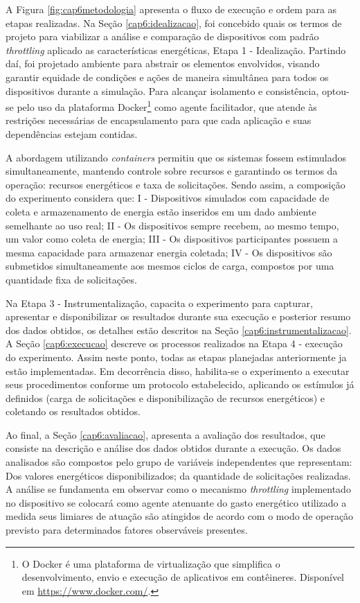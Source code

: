A Figura \ref{fig:cap6metodologia} apresenta o fluxo de execução e ordem para as etapas realizadas. Na Seção \ref{cap6:idealizacao}, foi concebido quais os termos de projeto para viabilizar a análise e comparação de dispositivos com padrão \textit{throttling} aplicado as características energéticas, Etapa 1 - Idealização. Partindo daí, foi projetado ambiente para abstrair os elementos envolvidos, visando garantir equidade de condições e ações de maneira simultânea para todos os dispositivos durante a simulação. Para alcançar isolamento e consistência, optou-se pelo uso da plataforma Docker\footnote{O Docker é uma plataforma de virtualização que simplifica o desenvolvimento, envio e execução de aplicativos em contêineres. Disponível em \url{https://www.docker.com/}.} como agente facilitador, que atende às restrições necessárias de encapsulamento para que cada aplicação e suas dependências estejam contidas. 

A abordagem utilizando  \textit{containers} permitiu que os sistemas fossem estimulados simultaneamente, mantendo controle sobre recursos e garantindo os termos da operação: recursos energéticos e taxa de solicitações. Sendo assim, a composição do experimento considera que:  I - Dispositivos simulados com capacidade de coleta e armazenamento de energia estão inseridos em um dado ambiente semelhante ao uso real; II - Os dispositivos sempre recebem, ao mesmo tempo, um valor como coleta de energia; III - Os dispositivos participantes possuem a mesma capacidade para armazenar energia coletada; IV - Os dispositivos são submetidos simultaneamente aos mesmos ciclos de carga, compostos por uma quantidade fixa de solicitações.

Na Etapa 3 - Instrumentalização, capacita o experimento para capturar, apresentar e disponibilizar os resultados durante sua execução e posterior resumo dos dados obtidos, os detalhes estão descritos na Seção \ref{cap6:instrumentalizacao}. A Seção \ref{cap6:execucao} descreve os processos realizados na Etapa 4 - execução do experimento. Assim neste ponto, todas as etapas planejadas anteriormente ja estão implementadas. Em decorrência disso, habilita-se o experimento a executar seus procedimentos conforme um protocolo estabelecido, aplicando os estímulos já definidos (carga de solicitações e disponibilização de recursos energéticos) e coletando os resultados obtidos.

Ao final, a Seção \ref{cap6:avaliacao}, apresenta a avaliação dos resultados, que consiste na descrição e análise dos dados obtidos durante a execução. Os dados analisados são compostos pelo grupo de variáveis independentes que representam: Dos valores energéticos disponibilizados; da quantidade de solicitações realizadas. A análise se fundamenta em observar como o mecanismo \textit{throttling} implementado no dispositivo se colocará como agente atenuante do gasto energético utilizado a medida seus limiares de atuação são atingidos de acordo com o modo de operação previsto para determinados fatores observáveis presentes.

